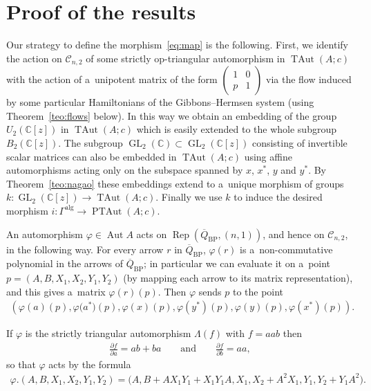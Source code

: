 \documentclass[pdftex]{sigma}
\newcommand{\bb}[1]{\mathbb{#1}}
\newcommand{\app}[3]{#1\colon #2\to #3}
\newcommand{\ol}[1]{\overline{#1}}
\newcommand{\smm}[1]{\left(\begin{smallmatrix} #1\end{smallmatrix}\right)}
\DeclareMathOperator{\GL}{GL}
\DeclareMathOperator{\Aut}{Aut}
\DeclareMathOperator{\TAut}{TAut}
\DeclareMathOperator{\PTAut}{PTAut}
\DeclareMathOperator{\Rep}{Rep}
\begin{document}
\section{Proof of the results}

Our strategy to def\/ine the morphism~\eqref{eq:map} is the following.
First, we identify the action on \(\mathcal{C}_{n,2}\) of some strictly op-triangular automorphism in
\(\TAut(A;c)\) with the action of a~unipotent matrix of the form \(\smm{1 & 0
\\ %
p & 1}\) via the f\/low induced by some particular Hamiltonians of the Gibbons--Hermsen system (using
Theorem~\ref{teo:flows} below).
In this way we obtain an embedding of the group \(U_{2}(\bb{C}[z])\) in \(\TAut(A;c)\) which is easily
extended to the whole subgroup \(B_{2}(\bb{C}[z])\).
The subgroup \(\GL_{2}(\bb{C})\subset \GL_{2}(\bb{C}[z])\) consisting of invertible scalar matrices can
also be embedded in \(\TAut(A;c)\) using af\/f\/ine automorphisms acting only on the subspace spanned by
\(x\), \(x^{*}\), \(y\) and \(y^{*}\).
By Theorem~\ref{teo:nagao} these embeddings extend to a~unique morphism of groups
\(\app{k}{\GL_{2}(\bb{C}[z])}{\TAut(A;c)}\).
Finally we use \(k\) to induce the desired morphism \(\app{i}{\Gamma^{\mathrm{alg}}}{\PTAut(A;c)}\).

An automorphism \(\varphi\in \Aut A\) acts on \(\Rep(\ol{Q}_{\mathrm{BP}},(n,1))\), and hence on
\(\mathcal{C}_{n,2}\), in the following way.
For every arrow \(r\) in \(\ol{Q}_{\mathrm{BP}}\), \(\varphi(r)\) is a~non-commutative polynomial in the
arrows of \(\ol{Q}_{\mathrm{BP}}\); in particular we can evaluate it on a~point \(p =
(A,B,X_{1},X_{2},Y_{1},Y_{2})\) (by mapping each arrow to its matrix representation), and this gives
a~matrix \(\varphi(r)(p)\).
Then \(\varphi\) sends \(p\) to the point
\begin{gather}
\label{eq:act-aut}
(\varphi(a)(p),\varphi\big(a^{*}\big)(p),\varphi(x)(p),\varphi(y^{*})(p),\varphi(y)(p),\varphi(x^{*})(p)).
\end{gather}

\begin{example}
If \(\varphi\) is the strictly triangular automorphism \(\Lambda(f)\) with \(f = aab\) then
\begin{gather*}
\frac{\partial f}{\partial a}=ab+ba \qquad \text{and}\qquad \frac{\partial f}{\partial b}=aa,
\end{gather*}
so that \(\varphi\) acts by the formula
\begin{gather*}
\varphi.(A,B,X_{1},X_{2},Y_{1},Y_{2})=\big(A,B+AX_{1}Y_{1}+X_{1}Y_{1}A,X_{1},X_{2}+A^{2}X_{1},Y_{1},Y_{2}
+Y_{1}A^{2}\big).
\end{gather*}
\end{example}
\end{document}
